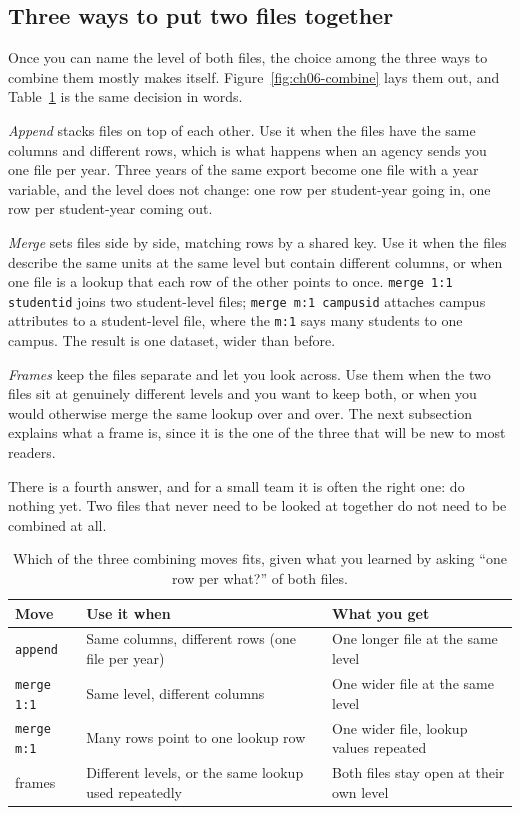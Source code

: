 \documentclass[
    a4paper,
    fontsize=10pt,
    twoside=true,
    numbers=noenddot,
]{kaobook}
\begin{document}
\subsection{Three ways to put two files together}\label{sec:ch06-threeways}
Once you can name the level of both files, the choice among the three ways to combine them mostly makes itself. Figure~\ref{fig:ch06-combine} lays them out, and Table~\ref{tab:ch06-combine} is the same decision in words.

\emph{Append} stacks files on top of each other. Use it when the files have the same columns and different rows, which is what happens when an agency sends you one file per year. Three years of the same export become one file with a year variable, and the level does not change: one row per student-year going in, one row per student-year coming out.

\emph{Merge} sets files side by side, matching rows by a shared key. Use it when the files describe the same units at the same level but contain different columns, or when one file is a lookup that each row of the other points to once. \texttt{merge 1:1 studentid} joins two student-level files; \texttt{merge m:1 campusid} attaches campus attributes to a student-level file, where the \texttt{m:1} says many students to one campus. The result is one dataset, wider than before.

\emph{Frames} keep the files separate and let you look across. Use them when the two files sit at genuinely different levels and you want to keep both, or when you would otherwise merge the same lookup over and over. The next subsection explains what a frame is, since it is the one of the three that will be new to most readers.

There is a fourth answer, and for a small team it is often the right one: do nothing yet. Two files that never need to be looked at together do not need to be combined at all.

\begin{table}[htbp]
\centering
\footnotesize
\caption[Append, merge, or frames]{Which of the three combining moves fits, given what you learned by asking \enquote{one row per what?} of both files.}
\label{tab:ch06-combine}
\begin{tabular}{@{}p{2.6cm}p{5.4cm}p{6.6cm}@{}}
\hline
Move & Use it when & What you get \\
\hline
\texttt{append} & Same columns, different rows (one file per year) & One longer file at the same level \\
\texttt{merge 1:1} & Same level, different columns & One wider file at the same level \\
\texttt{merge m:1} & Many rows point to one lookup row & One wider file, lookup values repeated \\
frames & Different levels, or the same lookup used repeatedly & Both files stay open at their own level \\
\hline
\end{tabular}
\end{table}
\end{document}
